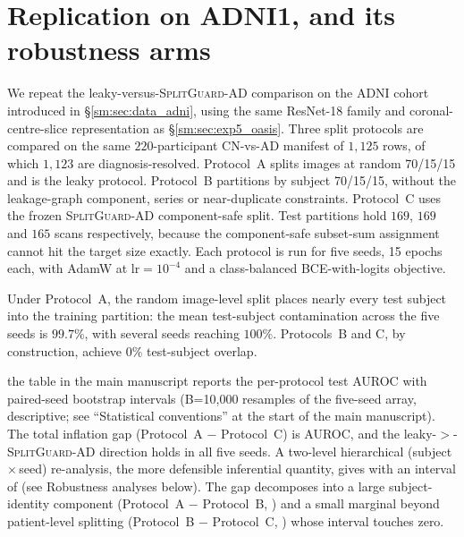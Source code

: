 \documentclass[11pt]{article}
\newcommand{\SGA}{\textsc{SplitGuard-AD}}
\begin{document}
\section{Replication on ADNI1, and its robustness arms}
\label{sm:sec:exp6_adni}

We repeat the leaky-versus-\SGA{} comparison on the ADNI cohort
introduced in \S\ref{sm:sec:data_adni}, using the same ResNet-18 family
and coronal-centre-slice representation as
\S\ref{sm:sec:exp5_oasis}. Three split protocols are compared on the same $220$-participant CN-vs-AD
manifest of $1{,}125$ rows, of which $1{,}123$ are diagnosis-resolved.
Protocol~A splits images at random 70/15/15 and is the leaky protocol.
Protocol~B partitions by subject 70/15/15, without the leakage-graph
component, series or near-duplicate constraints. Protocol~C uses the frozen
\SGA{} component-safe split. Test partitions hold $169$, $169$ and $165$
scans respectively, because the component-safe subset-sum assignment cannot
hit the target size exactly. Each protocol
is run for five seeds, 15 epochs each, with AdamW at
$\mathrm{lr}=10^{-4}$ and a class-balanced BCE-with-logits objective.

Under Protocol~A, the random image-level split places nearly every test
subject into the training partition: the mean test-subject contamination
across the five seeds is $99.7\%$, with several seeds reaching
$100\%$. Protocols~B and C, by construction, achieve $0\%$ test-subject
overlap.



the table in the main manuscript reports the per-protocol test AUROC with
paired-seed bootstrap intervals (B=10{,}000 resamples of
the five-seed array, descriptive;
see ``Statistical conventions'' at the start of the main manuscript).
The total inflation gap (Protocol~A $-$ Protocol~C) is
\AdniGapTotal{} \AdniGapCI{} AUROC, and the leaky-$>$-\SGA{} direction
holds in all five seeds. A two-level hierarchical
(subject\,$\times$\,seed) re-analysis, the more defensible inferential
quantity, gives \AdniHierGap{} with an interval of \AdniHierCI{} (see
Robustness analyses below). The gap decomposes into a large
subject-identity component (Protocol~A $-$ Protocol~B,
\AdniSubjectPart{}) and a small marginal beyond patient-level
splitting (Protocol~B $-$ Protocol~C, \AdniMarginal{}
\AdniMarginalCI{}) whose interval touches zero.
\end{document}
